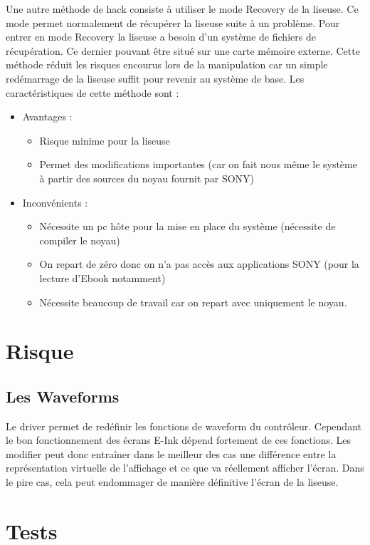 Une autre méthode de hack consiste à utiliser le mode Recovery de la liseuse.
Ce mode permet normalement de récupérer la liseuse suite à un problème.
Pour entrer en mode Recovery la liseuse a besoin d'un système de fichiers de récupération.
Ce dernier pouvant être situé sur une carte mémoire externe. Cette méthode réduit les risques encourus lors de la manipulation car un simple redémarrage de la liseuse 
suffit pour revenir au système de base. Les caractéristiques de cette méthode sont  : 
\begin{itemize}
	\renewcommand{\labelitemi}{$\bullet$}
	\item Avantages : 
	\begin{itemize}
		\item Risque minime pour la liseuse
		\item Permet des modifications importantes (car on fait nous même le système à partir des sources du noyau fournit par SONY)%
	\end{itemize}
	\item Inconvénients : 
		\begin{itemize}
			\item Nécessite un pc hôte pour la mise en place du système (nécessite de compiler le noyau)
			\item On repart de zéro donc on n'a pas accès aux applications SONY (pour la lecture d'Ebook notamment)
			\item Nécessite beaucoup de travail car on repart avec uniquement le noyau.
		\end{itemize}
\end{itemize}
\section{Risque}
\subsection{Les Waveforms}
	Le driver permet de redéfinir les fonctions de waveform du contrôleur.
Cependant le bon fonctionnement des écrans E-Ink dépend fortement de ces fonctions. Les modifier peut donc entraîner dans le meilleur des cas une différence entre la représentation virtuelle de l'affichage et ce que va réellement afficher l'écran. Dans le pire cas, cela peut endommager de manière définitive l'écran de la liseuse.

\section{Tests}

